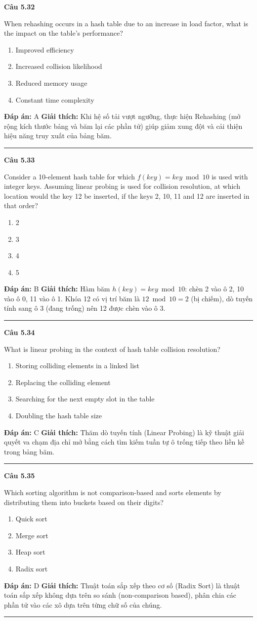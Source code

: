 \documentclass[11pt,a4paper]{article}
\newenvironment{question}[1]{%
  \par\vspace{1em}\noindent\textbf{\large Câu #1}\par\vspace{0.4em}
}{%
  \par\vspace{1em}\hrule\vspace{0.6em}
}
\newenvironment{choices}{%
  \begin{enumerate}[label=\textbf{\Alph*.},leftmargin=2.2em,itemsep=2pt,topsep=3pt]
}{%
  \end{enumerate}
}
\newcommand{\choice}{\item}
\begin{document}
\begin{question}{5.32}
When rehashing occurs in a hash table due to an increase in load factor, what is the impact on the table's performance?
\begin{choices}
\choice Improved efficiency
\choice Increased collision likelihood
\choice Reduced memory usage
\choice Constant time complexity
\end{choices}
\textbf{Đáp án:} A
\textbf{Giải thích:} Khi hệ số tải vượt ngưỡng, thực hiện Rehashing (mở rộng kích thước bảng và băm lại các phần tử) giúp giảm xung đột và cải thiện hiệu năng truy xuất của bảng băm.
\end{question}

\begin{question}{5.33}
Consider a 10-element hash table for which \(f(key) = key \bmod 10\) is used with integer keys. Assuming linear probing is used for collision resolution, at which location would the key 12 be inserted, if the keys 2, 10, 11 and 12 are inserted in that order?
\begin{choices}
\choice 2
\choice 3
\choice 4
\choice 5
\end{choices}
\textbf{Đáp án:} B
\textbf{Giải thích:} Hàm băm \(h(key) = key \bmod 10\): chèn 2 vào ô 2, 10 vào ô 0, 11 vào ô 1. Khóa 12 có vị trí băm là \(12 \bmod 10 = 2\) (bị chiếm), dò tuyến tính sang ô 3 (đang trống) nên 12 được chèn vào ô 3.
\end{question}

\begin{question}{5.34}
What is linear probing in the context of hash table collision resolution?
\begin{choices}
\choice Storing colliding elements in a linked list
\choice Replacing the colliding element
\choice Searching for the next empty slot in the table
\choice Doubling the hash table size
\end{choices}
\textbf{Đáp án:} C
\textbf{Giải thích:} Thăm dò tuyến tính (Linear Probing) là kỹ thuật giải quyết va chạm địa chỉ mở bằng cách tìm kiếm tuần tự ô trống tiếp theo liền kề trong bảng băm.
\end{question}

\begin{question}{5.35}
Which sorting algorithm is not comparison-based and sorts elements by distributing them into buckets based on their digits?
\begin{choices}
\choice Quick sort
\choice Merge sort
\choice Heap sort
\choice Radix sort
\end{choices}
\textbf{Đáp án:} D
\textbf{Giải thích:} Thuật toán sắp xếp theo cơ số (Radix Sort) là thuật toán sắp xếp không dựa trên so sánh (non-comparison based), phân chia các phần tử vào các xô dựa trên từng chữ số của chúng.
\end{question}
\end{document}

